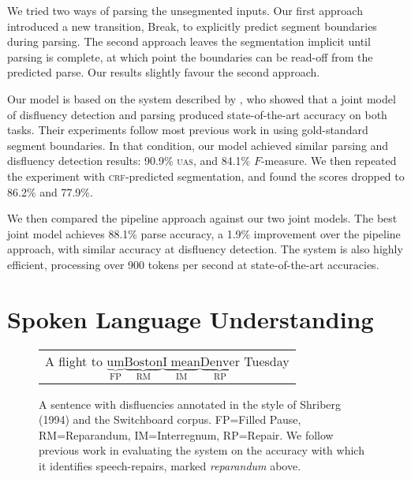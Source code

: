 \documentclass[11pt,letterpaper]{article}
\begin{document}
We tried two ways of parsing the unsegmented inputs.  Our first approach introduced
a new transition, Break, to explicitly predict segment boundaries during parsing.
The second approach leaves the segmentation implicit until
parsing is complete, at which point the boundaries can be read-off from the
predicted parse.  Our results slightly favour the second approach.

Our model is based on the system described
by \citet{honnibal:14}, who showed that a joint model of disfluency detection
and parsing produced state-of-the-art accuracy on both tasks.
Their experiments follow most previous work in using gold-standard segment boundaries.
In that condition, our model achieved similar parsing and disfluency
detection results: 90.9\% \textsc{uas}, and 84.1\% $F$-measure.
We then repeated the experiment with \textsc{crf}-predicted segmentation,
and found the scores dropped to 86.2\% and 77.9\%.

We then compared the pipeline approach against our two joint models.
The best joint model achieves 88.1\% parse accuracy, a 1.9\% improvement over
the pipeline approach, with similar accuracy at disfluency detection.  The
system is also highly efficient, processing over 900 tokens per second at
state-of-the-art accuracies.


\section{Spoken Language Understanding}

\begin{figure}
    \begin{tabular}{l}

        A flight to $\underbrace{\mathrm{um}}_\text{FP} \underbrace{\mathrm{Boston}}_\text{RM} \underbrace{\mathrm{I\;mean}}_\text{IM} \underbrace{\mathrm{Denver}}_\text{RP}$ Tuesday\\

\end{tabular}
\caption{\small A sentence with disfluencies annotated in the style of Shriberg (1994) 
    and the Switchboard corpus.
FP=Filled Pause, RM=Reparandum, IM=Interregnum, RP=Repair.
We follow previous work in evaluating the system on the accuracy with which
it identifies speech-repairs, marked \emph{reparandum} above.
\label{fig:shriberg}}
\end{figure}
\end{document}
